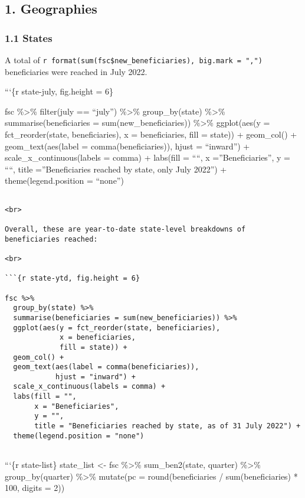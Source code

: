 \documentclass[
]{article}
\begin{document}
\hypertarget{geographies}{%
\subsection{1. Geographies}\label{geographies}}

\hypertarget{states}{%
\subsubsection{1.1 States}\label{states}}

A total of
\texttt{r\ format(sum(fsc\$new\_beneficiaries),\ big.mark\ =\ ",")}
beneficiaries were reached in July 2022.

```\{r state-july, fig.height = 6\}

fsc \%\textgreater\% filter(july == ``july'') \%\textgreater\%
group\_by(state) \%\textgreater\% summarise(beneficiaries =
sum(new\_beneficiaries)) \%\textgreater\% ggplot(aes(y =
fct\_reorder(state, beneficiaries), x = beneficiaries, fill = state)) +
geom\_col() + geom\_text(aes(label = comma(beneficiaries)), hjust =
``inward'') + scale\_x\_continuous(labels = comma) + labs(fill = ````, x
=''Beneficiaries'', y = ````, title =''Beneficiaries reached by state,
only July 2022'') + theme(legend.position = ``none'')

\begin{verbatim}

<br>

Overall, these are year-to-date state-level breakdowns of beneficiaries reached: 

<br>

```{r state-ytd, fig.height = 6}

fsc %>% 
  group_by(state) %>% 
  summarise(beneficiaries = sum(new_beneficiaries)) %>% 
  ggplot(aes(y = fct_reorder(state, beneficiaries), 
             x = beneficiaries, 
             fill = state)) + 
  geom_col() + 
  geom_text(aes(label = comma(beneficiaries)), 
            hjust = "inward") +
  scale_x_continuous(labels = comma) + 
  labs(fill = "", 
       x = "Beneficiaries", 
       y = "", 
       title = "Beneficiaries reached by state, as of 31 July 2022") + 
  theme(legend.position = "none")
  
\end{verbatim}

```\{r state-list\} state\_list \textless- fsc \%\textgreater\%
sum\_ben2(state, quarter) \%\textgreater\% group\_by(quarter)
\%\textgreater\% mutate(pc = round(beneficiaries / sum(beneficiaries) *
100, digits = 2))
\end{document}
